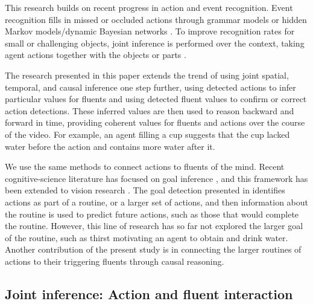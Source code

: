 \documentclass[10pt,journal,letterpaper,compsoc]{IEEEtran}
\begin{document}
This research builds on recent progress in action and event recognition.  Event recognition fills in missed or occluded actions through grammar models \cite{Mingtao} or hidden Markov models/dynamic Bayesian networks \cite{Brand, DBN}.  To improve recognition rates for small or challenging objects, joint inference is performed over the context,  taking agent actions together with the objects or parts \cite{yao2010modeling}.  


The research presented in this paper extends the trend of using joint spatial, temporal, and causal inference one step further, using detected actions to infer particular values for fluents and using detected fluent values to confirm or correct action detections.  These inferred values are then used to reason backward and forward in time, providing coherent values for fluents and actions over the course of the video.  For example, an agent filling a cup suggests that the cup lacked water before the action and contains more water after it.

We use the same methods to connect actions to fluents of the mind.  Recent cognitive-science literature has focused on goal inference \cite{Tenenbaum2009Cognition, csibra2007obsessed}, and this framework has been extended to vision research \cite{Mingtao}.  The goal detection presented in \cite{Mingtao} identifies actions as part of a routine, or a larger set of actions, and then information about the routine is used to predict future actions, such as those that would complete the routine.  However, this line of research has so far not explored the larger goal of the routine, such as thirst motivating an agent to obtain and drink water.  Another contribution of the present study is in connecting the larger routines of actions to their triggering fluents through causal reasoning. 



\subsection{Joint inference: Action and fluent interaction}


\end{document}
